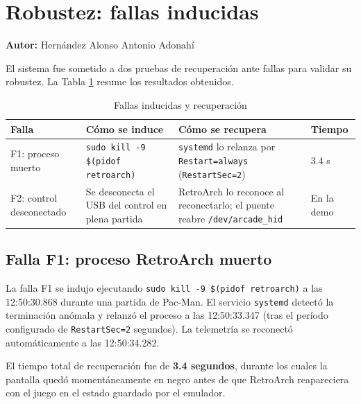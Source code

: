 \section{Robustez: fallas inducidas}
\textbf{Autor:} Hernández Alonso Antonio Adonahí

El sistema fue sometido a dos pruebas de recuperación ante fallas para validar su robustez. La Tabla \ref{tab:fallas} resume los resultados obtenidos.

\begin{table}[H]
	\centering
	\caption{Fallas inducidas y recuperación}
	\label{tab:fallas}
	\small
	\begin{tabular}{|p{1.7cm}|p{2.2cm}|p{2.4cm}|p{1.0cm}|}
		\hline
		\textbf{Falla} & \textbf{Cómo se induce} & \textbf{Cómo se recupera} & \textbf{Tiempo} \\
		\hline
		F1: proceso muerto & \texttt{sudo kill -9 \$(pidof retroarch)} & \texttt{systemd} lo relanza por \texttt{Restart=always} (\texttt{RestartSec=2}) & 3.4 s \\
		\hline
		F2: control desconectado & Se desconecta el USB del control en plena partida & RetroArch lo reconoce al reconectarlo; el puente reabre \texttt{/dev/arcade\_hid} & En la demo \\
		\hline
	\end{tabular}
\end{table}

\subsection{Falla F1: proceso RetroArch muerto}

La falla F1 se indujo ejecutando \texttt{sudo kill -9 \$(pidof retroarch)} a las 12:50:30.868 durante una partida de Pac-Man. El servicio \texttt{systemd} detectó la terminación anómala y relanzó el proceso a las 12:50:33.347 (tras el período configurado de \texttt{RestartSec=2} segundos). La telemetría se reconectó automáticamente a las 12:50:34.282.

El tiempo total de recuperación fue de \textbf{3.4 segundos}, durante los cuales la pantalla quedó momentáneamente en negro antes de que RetroArch reapareciera con el juego en el estado guardado por el emulador.

